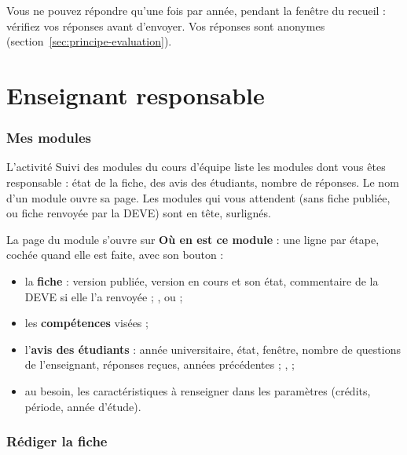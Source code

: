\documentclass[11pt,a4paper]{article}
\begin{document}
Vous ne pouvez répondre qu'une fois par année, pendant la fenêtre du recueil : vérifiez vos réponses
avant d'envoyer. Vos réponses sont anonymes (section~\ref{sec:principe-evaluation}).

\newpage
\part{Enseignant responsable}\label{part:enseignant}

\section{Mes modules}

L'activité \og Suivi des modules\fg{} du cours d'équipe liste les modules dont vous êtes
responsable : état de la fiche, des avis des étudiants, nombre de réponses. Le nom d'un module ouvre sa
page. Les modules qui vous attendent (sans fiche publiée, ou fiche renvoyée par la DEVE) sont en
tête, surlignés.


La page du module s'ouvre sur \textbf{Où en est ce module} : une ligne par étape, cochée quand
elle est faite, avec son bouton :
\begin{itemize}
  \item la \textbf{fiche} : version publiée, version en cours et son état, commentaire de la DEVE
    si elle l'a renvoyée ; ,  ou
     ;
  \item les \textbf{compétences} visées ;
  \item l'\textbf{avis des étudiants} : année universitaire, état, fenêtre, nombre de questions
    de l'enseignant, réponses reçues, années précédentes ; ,
     ;
  \item au besoin, les caractéristiques à renseigner dans les paramètres (crédits, période,
    année d'étude).
\end{itemize}


\section{Rédiger la fiche}
\end{document}
